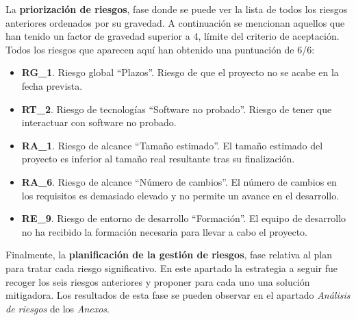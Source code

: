 \par La \textbf{priorización de riesgos}, fase donde se puede ver la lista de todos los riesgos anteriores ordenados por su gravedad. A continuación se mencionan aquellos que han tenido un factor de gravedad superior a 4, límite del criterio de aceptación. Todos los riesgos que aparecen aquí han obtenido una puntuación de 6/6: 
\begin{itemize}
\item \textbf{RG\_1}. Riesgo global “Plazos”. Riesgo de que el proyecto no se acabe en la fecha prevista. 
\item \textbf{RT\_2}. Riesgo de tecnologías “Software no probado”. Riesgo de tener que interactuar con software no probado. 
\item \textbf{RA\_1}. Riesgo de alcance “Tamaño estimado”.  El tamaño estimado del proyecto es inferior al tamaño real resultante tras su finalización. 
\item \textbf{RA\_6}. Riesgo de alcance “Número de cambios”.  El número de cambios en los requisitos es demasiado elevado y no permite un avance en el desarrollo. 
\item \textbf{RE\_9}. Riesgo de entorno de desarrollo “Formación”. El equipo de desarrollo no ha recibido la formación necesaria para llevar a cabo el proyecto.
\end{itemize}
\par Finalmente, la \textbf{planificación de la gestión de riesgos}, fase relativa al plan para tratar cada riesgo significativo. En este apartado la estrategia a seguir fue recoger los seis riesgos anteriores y proponer para cada uno una solución mitigadora. Los resultados de esta fase se pueden observar en el apartado \textit{Análisis de riesgos} de los \textit{Anexos}.

